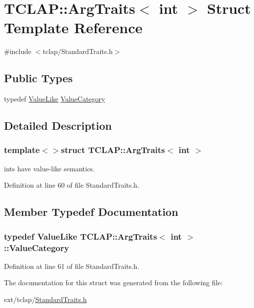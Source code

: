 \hypertarget{struct_t_c_l_a_p_1_1_arg_traits_3_01int_01_4}{}\section{T\+C\+L\+A\+P\+:\+:Arg\+Traits$<$ int $>$ Struct Template Reference}
\label{struct_t_c_l_a_p_1_1_arg_traits_3_01int_01_4}


{\ttfamily \#include $<$tclap/\+Standard\+Traits.\+h$>$}

\subsection*{Public Types}
\begin{DoxyCompactItemize}
\item 
typedef \hyperlink{struct_t_c_l_a_p_1_1_value_like}{Value\+Like} \hyperlink{struct_t_c_l_a_p_1_1_arg_traits_3_01int_01_4_a8e577764b626e9e928d71567123d92a9}{Value\+Category}
\end{DoxyCompactItemize}


\subsection{Detailed Description}
\subsubsection*{template$<$$>$struct T\+C\+L\+A\+P\+::\+Arg\+Traits$<$ int $>$}

ints have value-\/like semantics. 

Definition at line 60 of file Standard\+Traits.\+h.



\subsection{Member Typedef Documentation}
\hypertarget{struct_t_c_l_a_p_1_1_arg_traits_3_01int_01_4_a8e577764b626e9e928d71567123d92a9}{}
\subsubsection[{Value\+Category}]{\setlength{\rightskip}{0pt plus 5cm}typedef {\bf Value\+Like} {\bf T\+C\+L\+A\+P\+::\+Arg\+Traits}$<$ int $>$\+::{\bf Value\+Category}}\label{struct_t_c_l_a_p_1_1_arg_traits_3_01int_01_4_a8e577764b626e9e928d71567123d92a9}


Definition at line 61 of file Standard\+Traits.\+h.



The documentation for this struct was generated from the following file\+:\begin{DoxyCompactItemize}
\item 
ext/tclap/\hyperlink{_standard_traits_8h}{Standard\+Traits.\+h}\end{DoxyCompactItemize}
